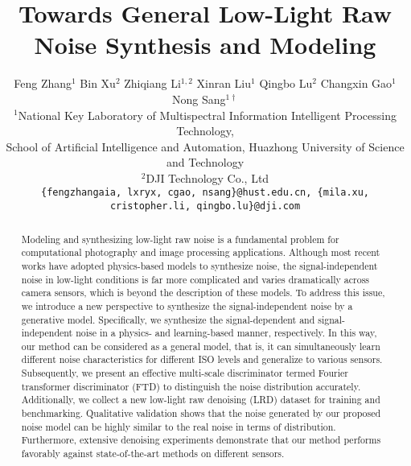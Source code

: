 \documentclass[10pt,twocolumn,letterpaper]{article}
\begin{document}
\title{Towards General Low-Light Raw Noise Synthesis and Modeling}

\author{
   \hspace{-0.4cm} Feng Zhang$^{1}$
     \hspace{0.01cm} 
    Bin Xu$^{2}$
     \hspace{0.01cm} 
    Zhiqiang Li$^{1,2}$
     \hspace{0.01cm} 
    Xinran Liu$^{1}$ 
     \hspace{0.01cm}
    Qingbo Lu$^{2}$ 
     \hspace{0.01cm}
    Changxin Gao$^{1}$
    \hspace{0.01cm}
    Nong Sang$^{1\dag}$\\
$^1$National Key Laboratory of Multispectral Information Intelligent Processing Technology,\\ School of Artificial Intelligence and Automation, Huazhong University of Science and Technology\\
$^2$DJI Technology Co., Ltd \\
{\tt\small\{fengzhangaia, lxryx, cgao, nsang\}@hust.edu.cn,
\{mila.xu, cristopher.li, qingbo.lu\}@dji.com}
}

\maketitle
\let\thefootnote\relax{}
\ificcvfinal\thispagestyle{empty}\fi


\begin{abstract}
Modeling and synthesizing low-light raw noise is a fundamental problem for computational photography and image processing applications. Although most recent works have adopted physics-based models to synthesize noise, the signal-independent noise in low-light conditions is far more complicated and varies dramatically across camera sensors, which is beyond the description of these models. To address this issue, we introduce a new perspective to synthesize the signal-independent noise by a generative model. Specifically, we synthesize the signal-dependent and signal-independent noise in a physics- and learning-based manner, respectively. In this way, our method can be considered as a general model, that is, it can simultaneously learn different noise characteristics for different ISO levels and generalize to various sensors. Subsequently, we present an effective multi-scale discriminator termed Fourier transformer discriminator (FTD) to distinguish the noise distribution accurately. Additionally, we collect a new low-light raw denoising (LRD) dataset for training and benchmarking. Qualitative validation shows that the noise generated by our proposed noise model can be highly similar to the real noise in terms of distribution. Furthermore, extensive denoising experiments demonstrate that our method performs favorably against state-of-the-art methods on different sensors.
\end{abstract}
\end{document}
